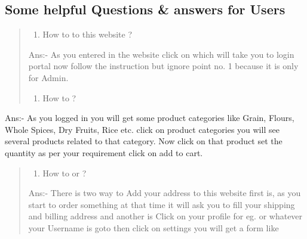 \documentclass[a4paper,10pt,english]{report}
\begin{document}
\subsection{Some helpful Questions \& answers for Users}
\label{\detokenize{faq:some-helpful-questions-answers-for-users}}\begin{quote}
\begin{enumerate}
\def\theenumi{\arabic{enumi}}
\def\labelenumi{\theenumi .}
\makeatletter\def\p@enumii{\p@enumi \theenumi .}\makeatother
\item {} 
How to  to this website ?

\end{enumerate}

Ans:- As you entered in the website click on {\hyperref[\detokenize{login:login}]{}} which will take you to login portal now follow the instruction but ignore point no. 1 because it is only for Admin.
\begin{enumerate}
\def\theenumi{\arabic{enumi}}
\def\labelenumi{\theenumi .}
\makeatletter\def\p@enumii{\p@enumi \theenumi .}\makeatother
\setcounter{enumi}{1}
\item {} 
How to  ?

\end{enumerate}
\end{quote}

Ans:- As you logged in you will get some product categories like Grain, Flours, Whole Spices, Dry Fruits, Rice etc. click on product categories you will see several products related to that category. Now click on that product set the quantity as per your requirement click on add to cart.
\begin{quote}
\begin{enumerate}
\def\theenumi{\arabic{enumi}}
\def\labelenumi{\theenumi .}
\makeatletter\def\p@enumii{\p@enumi \theenumi .}\makeatother
\setcounter{enumi}{2}
\item {} 
How to   or   ?

\end{enumerate}

Ans:- There is two way to Add your address to this website first is, as you start to order something at that time it will ask you to fill your shipping and billing address and another is Click on your profile for eg.  or whatever your Username is goto  then click on settings you will get a form like
\end{quote}
\end{document}
